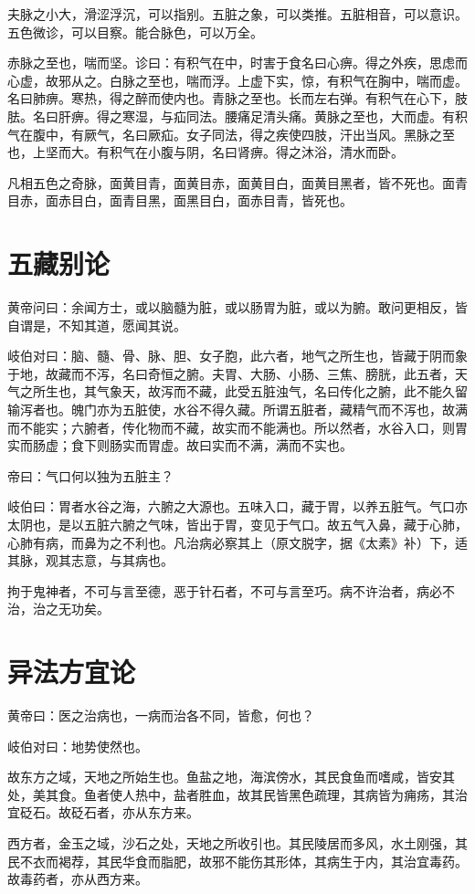 \documentclass{article}%
\begin{document}
夫脉之小大，滑涩浮沉，可以指别。五脏之象，可以类推。五脏相音，可以意识。五色微诊，可以目察。能合脉色，可以万全。

赤脉之至也，喘而坚。诊曰：有积气在中，时害于食名曰心痹。得之外疾，思虑而心虚，故邪从之。白脉之至也，喘而浮。上虚下实，惊，有积气在胸中，喘而虚。名曰肺痹。寒热，得之醉而使内也。青脉之至也。长而左右弹。有积气在心下，肢胠。名曰肝痹。得之寒湿，与疝同法。腰痛足清头痛。黄脉之至也，大而虚。有积气在腹中，有厥气，名曰厥疝。女子同法，得之疾使四肢，汗出当风。黑脉之至也，上坚而大。有积气在小腹与阴，名曰肾痹。得之沐浴，清水而卧。

凡相五色之奇脉，面黄目青，面黄目赤，面黄目白，面黄目黑者，皆不死也。面青目赤，面赤目白，面青目黑，面黑目白，面赤目青，皆死也。
\section{五藏别论}
黄帝问曰：余闻方士，或以脑髓为脏，或以肠胃为脏，或以为腑。敢问更相反，皆自谓是，不知其道，愿闻其说。

岐伯对曰：脑、髓、骨、脉、胆、女子胞，此六者，地气之所生也，皆藏于阴而象于地，故藏而不泻，名曰奇恒之腑。夫胃、大肠、小肠、三焦、膀胱，此五者，天气之所生也，其气象天，故泻而不藏，此受五脏浊气，名曰传化之腑，此不能久留输泻者也。魄门亦为五脏使，水谷不得久藏。所谓五脏者，藏精气而不泻也，故满而不能实；六腑者，传化物而不藏，故实而不能满也。所以然者，水谷入口，则胃实而肠虚；食下则肠实而胃虚。故曰实而不满，满而不实也。

帝曰：气口何以独为五脏主？

岐伯曰：胃者水谷之海，六腑之大源也。五味入口，藏于胃，以养五脏气。气口亦太阴也，是以五脏六腑之气味，皆出于胃，变见于气口。故五气入鼻，藏于心肺，心肺有病，而鼻为之不利也。凡治病必察其上（原文脱字，据《太素》补）下，适其脉，观其志意，与其病也。

拘于鬼神者，不可与言至德，恶于针石者，不可与言至巧。病不许治者，病必不治，治之无功矣。


\section{异法方宜论}
黄帝曰：医之治病也，一病而治各不同，皆愈，何也？

岐伯对曰：地势使然也。

故东方之域，天地之所始生也。鱼盐之地，海滨傍水，其民食鱼而嗜咸，皆安其处，美其食。鱼者使人热中，盐者胜血，故其民皆黑色疏理，其病皆为痈疡，其治宜砭石。故砭石者，亦从东方来。

西方者，金玉之域，沙石之处，天地之所收引也。其民陵居而多风，水土刚强，其民不衣而褐荐，其民华食而脂肥，故邪不能伤其形体，其病生于内，其治宜毒药。故毒药者，亦从西方来。
\end{document}
